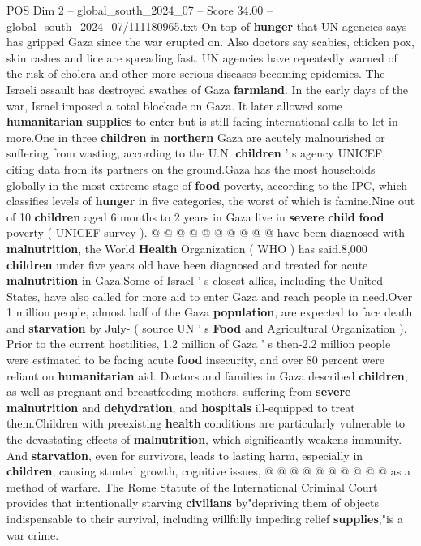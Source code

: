 \begin{textsample}{POS Dim 2 – global\_south\_2024\_07 – Score 34.00 – global\_south\_2024\_07/111180965.txt}
On top of \textbf{hunger} that UN agencies says has gripped Gaza since the war erupted on.
Also doctors say scabies, chicken pox, skin rashes and lice are spreading fast.
UN agencies have repeatedly warned of the risk of cholera and other more serious diseases becoming epidemics.
The Israeli assault has destroyed swathes of Gaza \textbf{farmland}.
In the early days of the war, Israel imposed a total blockade on Gaza.
It later allowed some \textbf{humanitarian} \textbf{supplies} to enter but is still facing international calls to let in more.One in three \textbf{children} in \textbf{northern} Gaza are acutely malnourished or suffering from wasting, according to the U.N. \textbf{children} ' s agency UNICEF, citing data from its partners on the ground.Gaza has the most households globally in the most extreme stage of \textbf{food} poverty, according to the IPC, which classifies levels of \textbf{hunger} in five categories, the worst of which is famine.Nine out of 10 \textbf{children} aged 6 months to 2 years in Gaza live in \textbf{severe} \textbf{child} \textbf{food} poverty ( UNICEF survey ). @ @ @ @ @ @ @ @ @ @ have been diagnosed with \textbf{malnutrition}, the World \textbf{Health} Organization ( WHO ) has said.8,000 \textbf{children} under five years old have been diagnosed and treated for acute \textbf{malnutrition} in Gaza.Some of Israel ' s closest allies, including the United States, have also called for more aid to enter Gaza and reach people in need.Over 1 million people, almost half of the Gaza \textbf{population}, are expected to face death and \textbf{starvation} by July- ( source UN ' s \textbf{Food} and Agricultural Organization ).
Prior to the current hostilities, 1.2 million of Gaza ' s then-2.2 million people were estimated to be facing acute \textbf{food} insecurity, and over 80 percent were reliant on \textbf{humanitarian} aid.
Doctors and families in Gaza described \textbf{children}, as well as pregnant and breastfeeding mothers, suffering from \textbf{severe} \textbf{malnutrition} and \textbf{dehydration}, and \textbf{hospitals} ill-equipped to treat them.Children with preexisting \textbf{health} conditions are particularly vulnerable to the devastating effects of \textbf{malnutrition}, which significantly weakens immunity.
And \textbf{starvation}, even for survivors, leads to lasting harm, especially in \textbf{children}, causing stunted growth, cognitive issues, @ @ @ @ @ @ @ @ @ @ as a method of warfare.
The Rome Statute of the International Criminal Court provides that intentionally starving \textbf{civilians} by"depriving them of objects indispensable to their survival, including willfully impeding relief \textbf{supplies},"is a war crime.

\end{textsample}
